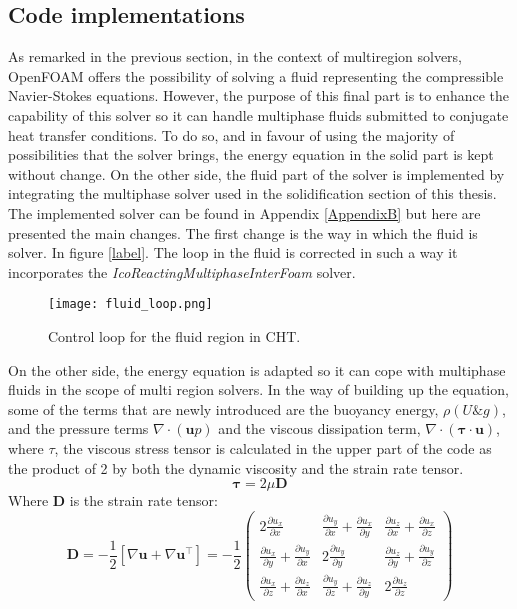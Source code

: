 \subsection{Code implementations}
As remarked in the previous section, in the context of multiregion solvers, OpenFOAM offers the possibility of solving a fluid representing the compressible Navier-Stokes equations. However, the purpose of this final part is to enhance the capability of this solver so it can handle multiphase fluids submitted to conjugate heat transfer conditions.
To do so, and in favour of using the majority of possibilities that the solver brings, the energy equation in the solid part is kept without change. On the other side, the fluid part of the solver is implemented by integrating the multiphase solver used in the solidification section of this thesis.  
The implemented solver can be found in Appendix \ref{AppendixB} but here are presented the main changes.
\newline
The first change is the way in which the fluid is solver. In figure \ref{label}. The loop in the fluid is corrected in such a way it incorporates the \textit{IcoReactingMultiphaseInterFoam} solver. 
\begin{figure}[h!]
	\centering
	\texttt{[image: fluid\_loop.png]}	
	\label{4.3fig}
	\caption{Control loop for the fluid region in CHT.}
\end{figure} 
\newline
On the other side, the energy equation is adapted so it can cope with multiphase fluids in the scope of multi region solvers. In the way of building up the equation, some of the terms that are newly introduced are the buoyancy energy, $\rho(U\&g)$, and the pressure terms $\nabla \cdot (\textbf{u}p)$ and the viscous dissipation term, $\nabla \cdot (\boldsymbol{\tau} \cdot \textbf{u})$, where $\tau$, the viscous stress tensor is calculated in the upper part of the code as the product of 2 by both the dynamic viscosity and the strain rate tensor.
\begin{equation}
\boldsymbol{\tau}=2 \mu \mathbf{D}
\end{equation}
Where \textbf{D} is the strain rate tensor:
\begin{equation}
	\mathbf{D}=-\frac{1}{2}\left[\nabla \mathbf{u}+\nabla \mathbf{u}^{\top}\right]=-\frac{1}{2}\left(\begin{array}{ccc}
	2 \frac{\partial u_{x}}{\partial x} & \frac{\partial u_{y}}{\partial x}+\frac{\partial u_{x}}{\partial y} & \frac{\partial u_{z}}{\partial x}+\frac{\partial u_{x}}{\partial z} \\
	\frac{\partial u_{x}}{\partial y}+\frac{\partial u_{y}}{\partial x} & 2 \frac{\partial u_{y}}{\partial y} & \frac{\partial u_{z}}{\partial y}+\frac{\partial u_{y}}{\partial z} \\
	\frac{\partial u_{x}}{\partial z}+\frac{\partial u_{z}}{\partial x} & \frac{\partial u_{y}}{\partial z}+\frac{\partial u_{z}}{\partial y} & 2 \frac{\partial u_{z}}{\partial z}
	\end{array}\right)
	\label{4.7}
\end{equation}

